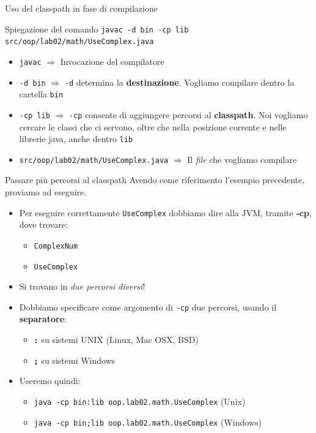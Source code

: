 \documentclass[xcolor=dvipsnames,presentation]{beamer}
\begin{document}
\begin{frame}{Uso del classpath in fase di compilazione}
\begin{block}{Spiegazione del comando}
        \texttt{javac -d bin -cp lib src/oop/lab02/math/UseComplex.java}
        \begin{itemize}
            \item \texttt{javac} $\Rightarrow$ Invocazione del compilatore
            \item \texttt{-d bin} $\Rightarrow$ \texttt{-d} determina la \textbf{destinazione}.
Vogliamo compilare dentro la cartella \texttt{bin}
            \item \texttt{-cp lib} $\Rightarrow$ \texttt{-cp} consente di aggiungere percorsi al
            \textbf{classpath}. Noi vogliamo cercare le classi che ci servono, oltre che nella
            posizione corrente e nelle librerie java, anche dentro \texttt{lib}
            \item \texttt{src/oop/lab02/math/UseComplex.java} $\Rightarrow$ Il \textit{file} che
vogliamo compilare
        \end{itemize}
    \end{block}
\end{frame}

\begin{frame}{Passare più percorsi al classpath}
    Avendo come riferimento l'esempio precedente, proviamo ad eseguire.
    \begin{itemize}
    \item Per eseguire correttamente \texttt{UseComplex} dobbiamo dire alla JVM, tramite
\textbf{-cp}, dove trovare:
    \begin{itemize}
        \item \texttt{ComplexNum}
        \item \texttt{UseComplex}
    \end{itemize}
        \item Si trovano in \textit{due percorsi diversi}!
        \item Dobbiamo specificare come argomento di \texttt{-cp} due percorsi, usando il
\textbf{separatore}:
        \begin{itemize}
            \item \textbf{\texttt{:}} su sistemi UNIX (Linux, Mac OSX, BSD)
            \item \textbf{\texttt{;}} su sistemi Windows
        \end{itemize}
        \item Useremo quindi:
        \begin{itemize}
            \item \texttt{java -cp bin:lib oop.lab02.math.UseComplex} (Unix)
            \item \texttt{java -cp bin;lib oop.lab02.math.UseComplex} (Windows)
        \end{itemize}
    \end{itemize}
\end{frame}
\end{document}
